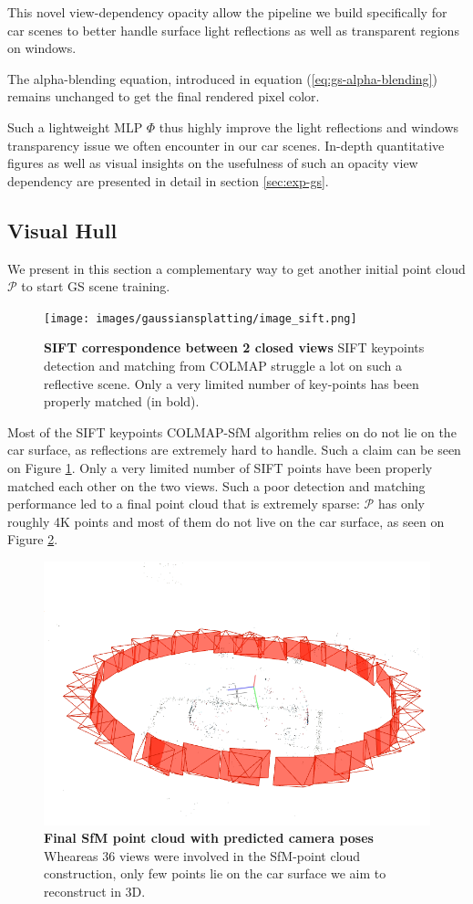 This novel view-dependency opacity allow the pipeline we build specifically for car scenes to better handle surface light reflections as well as transparent regions on windows.

The alpha-blending equation, introduced in equation (\ref{eq:gs-alpha-blending}) remains unchanged to get the final rendered pixel color.

Such a lightweight \ac{MLP} $\Phi$ thus highly improve the light reflections and windows transparency issue we often encounter in our car scenes. In-depth quantitative figures as well as visual insights on the usefulness of such an opacity view dependency are presented in detail in section \ref{sec:exp-gs}. 

\subsection{Visual Hull}

We present in this section a complementary way to get another initial point cloud $\mathcal{P}$ to start GS scene training. 


\begin{figure}[htbp!]
    \center
  \texttt{[image: images/gaussiansplatting/image\_sift.png]}
  \caption{\textbf{SIFT correspondence between 2 closed views} SIFT keypoints detection and matching from COLMAP struggle a lot on such a reflective scene. Only a very limited number of key-points has been properly matched (in bold).}
  \label{fig:sift-colmap}
\end{figure}

Most of the SIFT keypoints COLMAP-SfM algorithm relies on do not lie on the car surface, as reflections are extremely hard to handle. Such a claim can be seen on Figure \ref{fig:sift-colmap}. Only a very limited number of SIFT points have been properly matched each other on the two views. Such a poor detection and matching performance led to a 
final point cloud that is extremely sparse: $\mathcal{P}$ has only roughly 4K points and most of them do not live on the car surface, as seen on Figure \ref{fig:sfm-colmap-pc}. 

\begin{figure}[htbp!]
    \center
  \includegraphics[width=.8\linewidth]{images/gaussiansplatting/colmap_sparsePC.png}
  \caption{\textbf{Final SfM point cloud with predicted camera poses} Wheareas 36 views were involved in the SfM-point cloud construction, only few points lie on the car surface we aim to reconstruct in 3D.}
  \label{fig:sfm-colmap-pc}
\end{figure}


